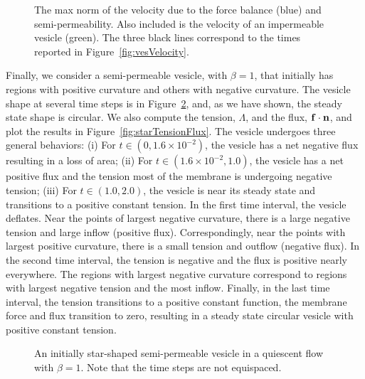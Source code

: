 \documentclass[aps,prl,showpacs]{revtex4}
\newif\ifTikz
\begin{document}
\begin{figure}[htp]
  \ifTikz
  
  \fi
  \caption{\label{fig:vesVelocityNorm} The max norm of the velocity due
  to the force balance (blue) and semi-permeability. Also included is
  the velocity of an impermeable vesicle (green). The three black lines
  correspond to the times reported in Figure~\ref{fig:vesVelocity}.}
\end{figure}

Finally, we consider a semi-permeable vesicle, with $\beta=1$, that
initially has regions with positive curvature and others with negative
curvature. The vesicle shape at several time steps is in
Figure~\ref{fig:starShape}, and, as we have shown, the steady state
shape is circular.  We also compute the tension, $\Lambda$, and the
flux, $\mathbf{f} \cdot \mathbf{n}$, and plot the results in
Figure~\ref{fig:starTensionFlux}. The vesicle undergoes three general
behaviors: (i) For $t \in (0,1.6 \times 10^{-2})$, the vesicle has a net
negative flux resulting in a loss of area; (ii) For $t \in (1.6 \times
10^{-2},1.0)$, the vesicle has a net positive flux and the tension most
of the membrane is undergoing negative tension; (iii) For $t \in
(1.0,2.0)$, the vesicle is near its steady state and transitions to a
positive constant tension. In the first time interval, the vesicle
deflates. Near the points of largest negative curvature, there is a
large negative tension and large inflow (positive flux).
Correspondingly, near the points with largest positive curvature, there
is a small tension and outflow (negative flux). In the second time
interval, the tension is negative and the flux is positive nearly
everywhere. The regions with largest negative curvature correspond to
regions with largest negative tension and the most inflow. Finally, in
the last time interval, the tension transitions to a positive constant
function, the membrane force and flux transition to zero, resulting in a
steady state circular vesicle with positive constant tension.

\begin{figure}[htp]
    \ifTikz
    
    \quad
    
    \quad
    
    \quad
    
    \quad
    
    \fi
  \caption{\label{fig:starShape} An initially star-shaped semi-permeable
  vesicle in a quiescent flow with $\beta=1$. Note that the time steps
  are not equispaced.}
\end{figure}
\end{document}
